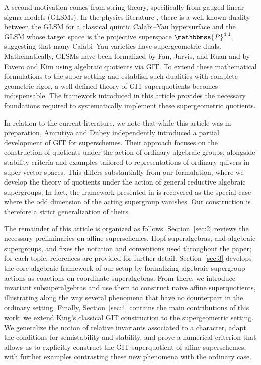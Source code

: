 \documentclass[11pt,a4paper,reqno,noamsfonts]{amsart}
\numberwithin{equation}{section}
\theoremstyle{definition}
\theoremstyle{remark}
\newcommand{\PP}{\ensuremath{\mathbbmss{P}}}
\begin{document}
A second motivation comes from string theory, specifically from gauged linear sigma models (GLSMs). In the physics literature \cite{GuZou2019,Zou2025,ErLiuTan2026}, there is a well-known duality between the GLSM for a classical quintic Calabi–Yau hypersurface and the GLSM whose target space is the projective superspace $\PP^{4\vert{}1}$, suggesting that many Calabi–Yau varieties have supergeometric duals. Mathematically, GLSMs have been formalized by Fan, Jarvis, and Ruan \cite{FanJarvisRuan2018} and by Favero and Kim \cite{FaveroKim2020} using algebraic quotients via GIT. To extend these mathematical formulations to the super setting and establish such dualities with complete geometric rigor, a well-defined theory of GIT superquotients becomes indispensable. The framework introduced in this article provides the necessary foundations required to systematically implement these supergeometric quotients.

In relation to the current literature, we note that while this article was in preparation, Amrutiya and Dubey \cite{AmrutiyaDubey2026} independently introduced a partial development of GIT for superschemes. Their approach focuses on the construction of quotients under the action of ordinary algebraic groups, alongside stability criteria and examples tailored to representations of ordinary quivers in super vector spaces. This differs substantially from our formulation, where we develop the theory of quotients under the action of general reductive algebraic supergroups. In fact, the framework presented in \cite{AmrutiyaDubey2026} is recovered as the special case where the odd dimension of the acting supergroup vanishes. Our construction is therefore a strict generalization of theirs.

The remainder of this article is organized as follows. Section~\ref{sec:2} reviews the necessary preliminaries on affine superschemes, Hopf superalgebras, and algebraic supergroups, and fixes the notation and conventions used throughout the paper; for each topic, references are provided for further detail. Section~\ref{sec:3} develops the core algebraic framework of our setup by formalizing algebraic supergroup actions as coactions on coordinate superalgebras. From there, we introduce invariant subsuperalgebras and use them to construct naive affine superquotients, illustrating along the way several phenomena that have no counterpart in the ordinary setting. Finally, Section~\ref{sec:4} contains the main contributions of this work: we extend King's classical GIT construction to the supergeometric setting. We generalize the notion of relative invariants associated to a character, adapt the conditions for semistability and stability, and prove a numerical criterion that allows us to explicitly construct the GIT superquotient of affine superschemes, with further examples contrasting these new phenomena with the ordinary case.
\end{document}

